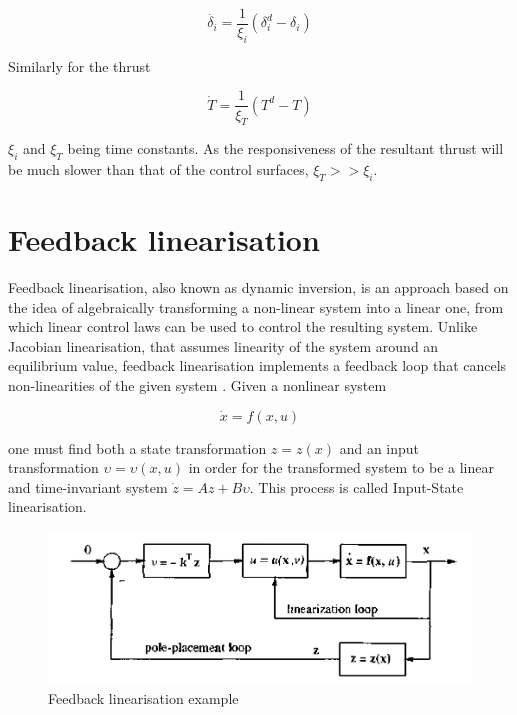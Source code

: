 \begin{equation}
\dot{\delta_i} = \dfrac{1}{\xi_i}(\delta_i^d-\delta_i)
\end{equation}

Similarly for the thrust

\begin{equation}
\dot{T} = \dfrac{1}{\xi_T}(T^d-T)
\end{equation}

$\xi_i$ and $\xi_T$ being time constants. As the responsiveness of the resultant thrust will be much slower than that of the control surfaces, $\xi_T>>\xi_i$.
\section{Feedback linearisation}
\label{section:background/NLI}

Feedback linearisation, also known as dynamic inversion, is an approach based on the idea of algebraically transforming a non-linear system into a linear one, from which linear control laws can be used to control the resulting system. Unlike Jacobian linearisation, that assumes linearity of the system around an equilibrium value, feedback linearisation implements a feedback loop that cancels non-linearities of the given system \cite{Slotine+Li}. Given a nonlinear system 

\begin{equation}
\dot{x} = f(x,u)
\label{eq:nonlinear_system}
\end{equation}

one must find both a state transformation $z=z(x)$ and an input transformation $\upsilon = \upsilon(x,u)$ in order for the transformed system to be a linear and time-invariant system $\dot{z} = Az+B\upsilon$. This process is called Input-State linearisation. 

\begin{figure}[!htb]
  \centering
  \includegraphics[width=1\textwidth]{Figures/NLI}
  \caption[Feedback linearisation example]{Feedback linearisation example}
  \label{fig:nli}
\end{figure}

